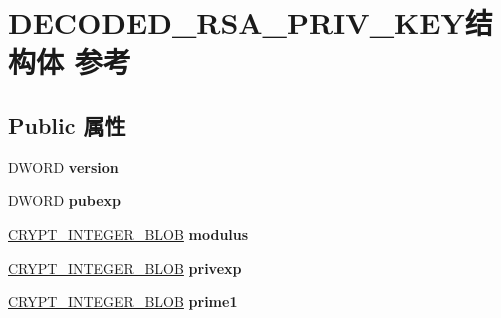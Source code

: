 \hypertarget{struct_d_e_c_o_d_e_d___r_s_a___p_r_i_v___k_e_y}{}\section{D\+E\+C\+O\+D\+E\+D\+\_\+\+R\+S\+A\+\_\+\+P\+R\+I\+V\+\_\+\+K\+E\+Y结构体 参考}
\label{struct_d_e_c_o_d_e_d___r_s_a___p_r_i_v___k_e_y}
\subsection*{Public 属性}
\begin{DoxyCompactItemize}
\item 
\mbox{\label{struct_d_e_c_o_d_e_d___r_s_a___p_r_i_v___k_e_y_a964c53d2ddc770893d39575faaf41d47}} 
D\+W\+O\+RD {\bfseries version}
\item 
\mbox{\label{struct_d_e_c_o_d_e_d___r_s_a___p_r_i_v___k_e_y_a5b3a11c0980fad6fca5afd80c6105dec}} 
D\+W\+O\+RD {\bfseries pubexp}
\item 
\mbox{\label{struct_d_e_c_o_d_e_d___r_s_a___p_r_i_v___k_e_y_a375275f8c516642e89463172faab99ca}} 
\hyperlink{struct___c_r_y_p_t_o_a_p_i___b_l_o_b}{C\+R\+Y\+P\+T\+\_\+\+I\+N\+T\+E\+G\+E\+R\+\_\+\+B\+L\+OB} {\bfseries modulus}
\item 
\mbox{\label{struct_d_e_c_o_d_e_d___r_s_a___p_r_i_v___k_e_y_a236385eda961b44de76aee32bdc83971}} 
\hyperlink{struct___c_r_y_p_t_o_a_p_i___b_l_o_b}{C\+R\+Y\+P\+T\+\_\+\+I\+N\+T\+E\+G\+E\+R\+\_\+\+B\+L\+OB} {\bfseries privexp}
\item 
\mbox{\label{struct_d_e_c_o_d_e_d___r_s_a___p_r_i_v___k_e_y_ae482aab0c857698e5794ac1712a6dfee}} 
\hyperlink{struct___c_r_y_p_t_o_a_p_i___b_l_o_b}{C\+R\+Y\+P\+T\+\_\+\+I\+N\+T\+E\+G\+E\+R\+\_\+\+B\+L\+OB} {\bfseries prime1}
\item 
\mbox{\label{struct_d_e_c_o_d_e_d___r_s_a___p_r_i_v___k_e_y_aca8f71480f9a2204e7e6b7fd1743f219}} 

\end{DoxyCompactItemize}
